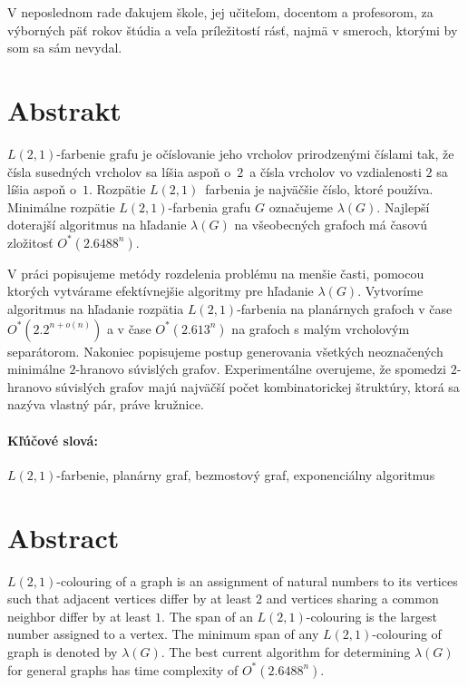 \documentclass[12pt, oneside]{book}
\begin{document}
V neposlednom rade ďakujem škole, jej učiteľom, docentom a profesorom, za výborných päť
rokov štúdia a veľa príležitostí rásť, najmä v smeroch, ktorými by som sa sám nevydal.


\newpage 
\section*{Abstrakt}

$L(2,1)$-farbenie grafu je očíslovanie jeho vrcholov prirodzenými číslami tak,
že čísla susedných vrcholov sa líšia aspoň o $2$ a čísla vrcholov vo vzdialenosti
$2$ sa líšia aspoň o $1$. Rozpätie $L(2,1)$ farbenia je najväčšie číslo, ktoré
používa. Minimálne rozpätie $L(2,1)$-farbenia grafu $G$ označujeme $\lambda(G)$.
Najlepší doterajší algoritmus na hľadanie $\lambda(G)$ na všeobecných grafoch má
časovú zložitosť $O^*(2.6488^n)$.

V práci popisujeme metódy rozdelenia problému na menšie časti, pomocou
ktorých vytvárame efektívnejšie algoritmy pre hľadanie $\lambda(G)$.
Vytvoríme algoritmus na hľadanie rozpätia $L(2,1)$-farbenia na planárnych
grafoch v čase $O^*(2.2^{n + o(n)})$ a v čase $O^*(2.613^n)$ na grafoch s malým
vrcholovým separátorom. Nakoniec popisujeme postup generovania všetkých neoznačených
minimálne $2$-hranovo súvislých grafov. Experimentálne overujeme, že spomedzi $2$-hranovo
súvislých grafov majú najväčší počet kombinatorickej štruktúry, ktorá sa
nazýva vlastný pár, práve kružnice.

\paragraph*{Kľúčové slová:} $L(2,1)$-farbenie, planárny graf, bezmostový graf, exponenciálny algoritmus



\newpage 
\section*{Abstract}

$L(2,1)$-colouring of a graph is an assignment of natural numbers to its vertices such
that adjacent vertices differ by at least $2$ and vertices sharing a common neighbor
differ by at least $1$. The span of an $L(2,1)$-colouring is the largest number assigned
to a vertex. The minimum span of any $L(2,1)$-colouring of graph is denoted by $\lambda(G)$.
The best current algorithm for determining $\lambda(G)$ for general graphs has
time complexity of $O^*(2.6488^n)$.
\end{document}
